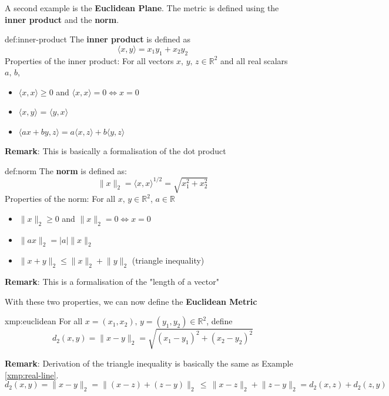 \documentclass{article}
\begin{document}
\newpage
A second example is the \textbf{Euclidean Plane}. The metric is defined using the \textbf{inner product} and the \textbf{norm}.

\begin{dfn}{def:inner-product}{}
    The \textbf{inner product} is defined as
    \[\langle x,y \rangle = x_{1}y_{1} + x_{2}y_{2}\]
    Properties of the inner product:
    For all vectors $x,\,y,\,z\in \mathbb{R}^{2}$ and all real scalars $a,\,b$,
    \begin{itemize}
        \item $\langle x,x \rangle\ge 0$ and $\langle x,x \rangle = 0 \iff x = 0$
        \item $\langle x,y \rangle$ = $\langle y,x \rangle$
        \item $\langle ax+by,z \rangle = a\langle x,z \rangle + b\langle y,z \rangle$
    \end{itemize}
\end{dfn}

\textbf{Remark}: This is basically a formalisation of the dot product

\begin{dfn}[Norm]{def:norm}{}
    The \textbf{norm} is defined as:
    \[\lVert x \rVert_{2} = \langle x,x \rangle^{1/2} = \sqrt{x^{2}_{1} + x^{2}_{2}}\]
    Properties of the norm: For all $x,\,y\in\mathbb{R}^{2}$, $a\in\mathbb{R}$
    \begin{itemize}
        \item $\lVert x \rVert_{2} \ge 0$ and $\lVert x \rVert_{2} = 0 \iff x = 0$
        \item $\lVert ax \rVert_{2} = \lvert a \rvert\lVert x \rVert_{2}$
        \item $\lVert x+y \rVert_{2} \le \lVert x \rVert_{2}+\lVert y \rVert_{2}$ (triangle inequality)
    \end{itemize}
\end{dfn}
\textbf{Remark}: This is a formalisation of the "length of a vector"

With these two properties, we can now define the \textbf{Euclidean Metric}
\begin{xmp}{xmp:euclidean}{}
    For all $x = (x_{1},x_{2}),\, y=(y_{1},y_{2})\in \mathbb{R}^{2}$, define
    \[d_{2}(x,y) = \lVert x-y \rVert_{2}=\sqrt{(x_{1}-y_{1})^{2} + (x_{2}-y_{2})^{2}}\]
\end{xmp}

\textbf{Remark}: Derivation of the triangle inequality is basically the same as Example \ref{xmp:real-line}. 
\[d_{2}(x,y) = \lVert x - y \rVert_{2} = \lVert (x-z) + (z-y) \rVert_{2} \,\le\, \lVert x-z \rVert_{2} + \lVert z-y \rVert_{2} = d_{2}(x,z) + d_{2}(z, y)\]
\end{document}
